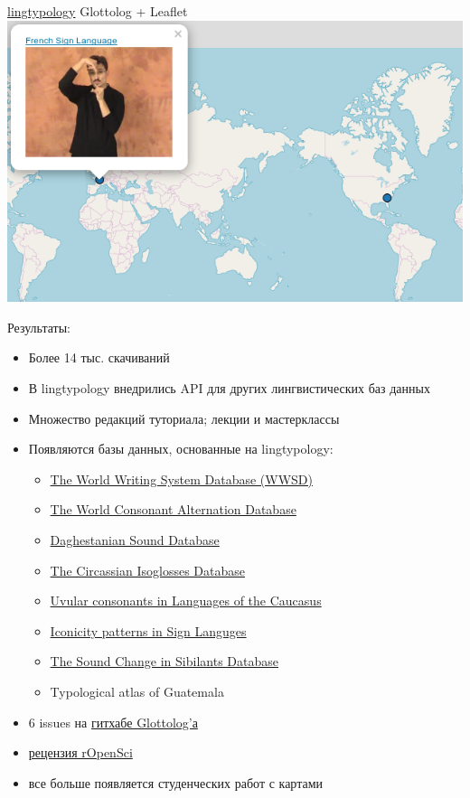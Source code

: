 \documentclass[13pt, t, aspectratio=169]{beamer}
\begin{document}
\begin{frame}{\href{https://ropensci.github.io/lingtypology/}{lingtypology}}
\alert{\large Glottolog + Leaflet}\\
\vfill
\includegraphics[width=0.8\linewidth]{images/06-sign}
\end{frame}

\begin{frame}{Результаты:}
\begin{itemize}
\item Более 14 тыс. скачиваний \pause
\item В lingtypology внедрились API для других лингвистических баз данных\pause
\item Множество редакций туториала; лекции и мастерклассы\pause
\item Появляются базы данных, основанные на lingtypology:
\begin{itemize}
\item \href{https://agricolamz.github.io/wwsd/}{The World Writing System Database  (WWSD)}
\item \href{https://agricolamz.github.io/wcad/}{The World Consonant Alternation Database}
\item \href{https://daghestanian-sound-database.herokuapp.com/}{Daghestanian Sound Database}
\item \href{https://agricolamz.github.io/The_Circassian_Isoglosses_Database/}{The Circassian Isoglosses Database}
\item \href{https://agricolamz.github.io/uvular_database/}{Uvular consonants in Languages of the Caucasus}
\item \href{https://sl-iconicity.shinyapps.io/iconicity_patterns/}{Iconicity patterns in Sign Languges}
\item \href{https://agricolamz.github.io/scsd/}{The Sound Change in Sibilants Database}
\item Typological atlas of Guatemala \pause
\end{itemize}
\item 6 issues на \href{https://github.com/clld/glottolog}{гитхабе Glottolog'а} \pause
\item \href{https://github.com/ropensci/software-review/issues/95}{рецензия rOpenSci} \pause
\item все больше появляется студенческих работ с картами
\end{itemize}
\end{frame}

\end{document}

